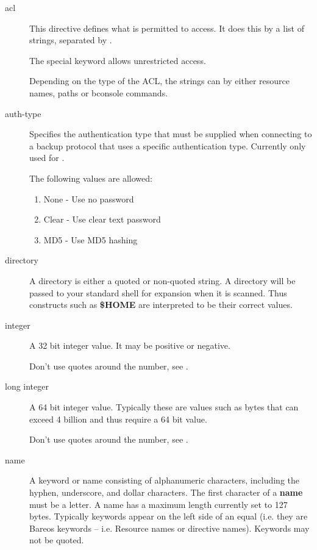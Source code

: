 \begin{description}

\item [acl]
    \label{DataTypeAcl}
This directive defines what is permitted to access.
It does this by a list of strings, separated by \parameter{,}.

The special keyword  allows unrestricted access.

Depending on the type of the ACL, the strings can by either resource names, paths or bconsole commands.


\item [auth-type]
    \label{DataTypeAuthType}
Specifies the authentication type that must be supplied when connecting to
a backup protocol that uses a specific authentication type.
Currently only used for .

The following values are allowed:
\begin{enumerate}
\item None - Use no password
\item Clear - Use clear text password
\item MD5 - Use MD5 hashing
\end{enumerate}


\item [directory]
    \label{DataTypeDirectory}
   A directory is either a quoted or  non-quoted string. A directory will be
passed to your  standard shell for expansion when it is scanned. Thus
constructs such as {\bf \$HOME} are interpreted to be  their correct values.


\item [integer]
    \label{DataTypeInteger}
   A 32 bit integer value. It may be positive or negative.

   Don't use quotes around the number, see .


\item [long integer]
    \label{DataTypeLongInteger}
   A 64 bit integer value. Typically these  are values such as bytes that can
exceed 4 billion and thus  require a 64 bit value.

   Don't use quotes around the number, see .


\item [name]
    \label{DataTypeName}
   A keyword or name consisting of alphanumeric characters, including the
hyphen, underscore, and dollar  characters. The first character of a {\bf
name} must be  a letter.  A name has a maximum length currently set to 127
bytes.  Typically keywords appear on the left side of an equal (i.e.  they are
Bareos keywords -- i.e. Resource names or  directive names). Keywords may not
be quoted.


\end{description}
